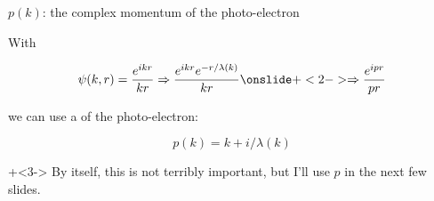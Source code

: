 \begin{slide}{${p(k)}$: the complex momentum of the photo-electron }

  With

    \[ \displaystyle{{
        \psi(k,r)  =  {\frac{e^{ikr}}{kr}}
        \Rightarrow   {\frac{e^{ikr}e^{-r/\lambda(k)}}{kr}}
        \onslide+<2->
        \Rightarrow {\frac{e^{ipr}}{pr}} }}
    \]

    we can use a {} of the photo-electron:

    \[{p(k) = k + i / \lambda(k) } \]

    \onslide+<3->
    By itself, this is not terribly important, but I'll use $p$ in the next
    few slides.

    \vfill
\end{slide}













